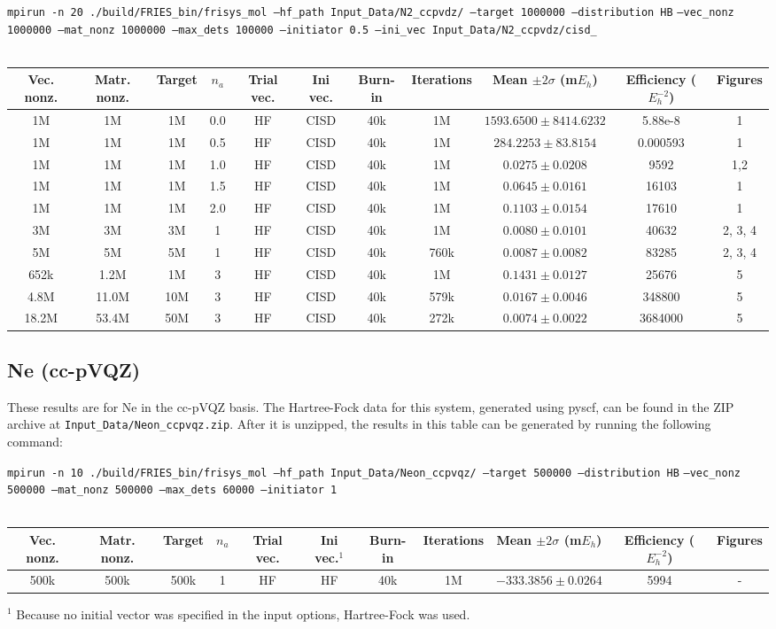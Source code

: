 \documentclass[12pt, landscape]{article}
\begin{document}
\texttt{mpirun -n 20 ./build/FRIES\_bin/frisys\_mol --hf\_path Input\_Data/N2\_ccpvdz/ --target 1000000 --distribution HB} \texttt{--vec\_nonz 1000000 --mat\_nonz 1000000 --max\_dets 100000 --initiator 0.5 --ini\_vec Input\_Data/N2\_ccpvdz/cisd\_}
\\~\\
\begin{tabular}{c|c|c|c|c|c|c|c|c|c|c}
Vec. nonz. & Matr. nonz. & Target & $n_a$ & Trial vec. & Ini vec. & Burn-in & Iterations & Mean $\pm 2 \sigma$ (m$E_h$) & Efficiency ($E_h^{-2}$) & Figures \\ \hline
1M & 1M & 1M & 0.0 & HF & CISD & 40k & 1M & $1593.6500 \pm 8414.6232$ & 5.88e-8 & 1 \\
1M & 1M & 1M & 0.5 & HF & CISD & 40k & 1M & $284.2253 \pm 83.8154$ & 0.000593 & 1 \\
1M & 1M & 1M & 1.0 & HF & CISD & 40k & 1M & $0.0275 \pm 0.0208$ & 9592 & 1,2 \\
1M & 1M & 1M & 1.5 & HF & CISD & 40k & 1M & $0.0645 \pm 0.0161$ & 16103 & 1 \\
1M & 1M & 1M & 2.0 & HF & CISD & 40k & 1M & $0.1103 \pm 0.0154$ & 17610 & 1 \\
3M & 3M & 3M & 1 & HF & CISD & 40k & 1M & $0.0080 \pm 0.0101$ & 40632 & 2, 3, 4\\
5M & 5M & 5M & 1 & HF & CISD & 40k & 760k & $0.0087 \pm 0.0082$ & 83285 & 2, 3, 4\\
652k & 1.2M & 1M &  3 & HF & CISD & 40k & 1M & $0.1431 \pm 0.0127$ & 25676 & 5 \\
4.8M & 11.0M & 10M & 3 & HF & CISD & 40k & 579k & $0.0167 \pm 0.0046$ & 348800 & 5 \\
18.2M & 53.4M & 50M & 3 & HF & CISD & 40k & 272k & $0.0074 \pm 0.0022$ & 3684000 & 5\\
\end{tabular}

\subsection*{Ne (cc-pVQZ)}
These results are for Ne in the cc-pVQZ basis. The Hartree-Fock data for this system, generated using pyscf, can be found in the ZIP archive at \texttt{Input\_Data/Neon\_ccpvqz.zip}. After it is unzipped, the results in this table can be generated by running the following command:

\texttt{mpirun -n 10 ./build/FRIES\_bin/frisys\_mol --hf\_path Input\_Data/Neon\_ccpvqz/ --target 500000 --distribution HB} \texttt{--vec\_nonz 500000 --mat\_nonz 500000 --max\_dets 60000 --initiator 1}
\\~\\
\begin{tabular}{c|c|c|c|c|c|c|c|c|c|c}
Vec. nonz. & Matr. nonz. & Target & $n_a$ & Trial vec. & Ini vec.$^1$ & Burn-in & Iterations & Mean $\pm 2 \sigma$ (m$E_h$) & Efficiency ($E_h^{-2}$) & Figures \\ \hline
500k & 500k & 500k & 1 & HF & HF & 40k & 1M & $-333.3856 \pm 0.0264$ & 5994 & - \\
\end{tabular}
$^1$ Because no initial vector was specified in the input options, Hartree-Fock was used.\\
\end{document}
